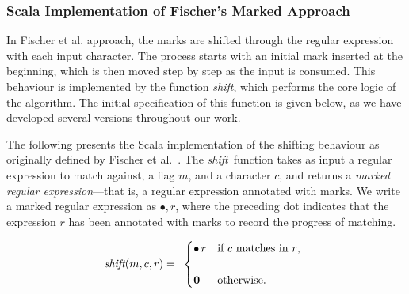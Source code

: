 \documentclass[12pt]{article}
\newcommand{\ZERO}{\textbf{0}}
\newcommand{\shift}{\textit{shift}}
\newcommand{\Marked}[1]{\bullet\,#1}
\begin{document}
\subsubsection{Scala Implementation of Fischer’s Marked Approach}

In Fischer et al. approach, the marks are shifted through the regular expression with each input character. 
The process starts with an initial mark inserted at the beginning, which is then moved step by step as the input is consumed. 
This behaviour is implemented by the function \shift, which performs the core logic of the algorithm. 
The initial specification of this function is given below, as we have developed several versions throughout our work.

The following presents the Scala implementation of the shifting behaviour as originally defined by Fischer et al.~\cite{Fischer2010}.
The \shift\ function takes as input a regular expression to match against, a flag $m$, and a character $c$, and returns a \emph{marked
regular expression}—that is, a regular expression annotated with marks. We write a marked regular expression as $\bullet,r$, where the 
preceding dot indicates that the expression $r$ has been annotated with marks to record the progress of matching.


\[
\renewcommand{\arraystretch}{1.7}
\shift(m, c, r) =
\begin{array}{l}
  \begin{cases}
    \Marked{r} & \text{if $c$ matches in $r$}, \\\\
    \ZERO\, & \text{otherwise.}
  \end{cases}
\end{array}
\renewcommand{\arraystretch}{1.0}
\]
\end{document}

